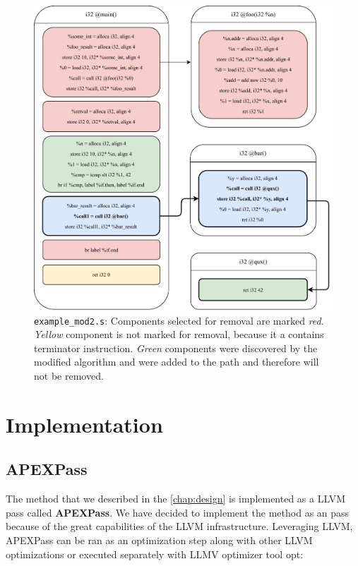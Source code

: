 \documentclass[12pt, twoside]{fithesis2}
\renewcommand{\_}{\leavevmode \kern0.07em\vbox{\hrule width0.4em}}
\begin{document}
\begin{figure}[ht]
    \centering
    \includegraphics[]{images/example_mod2/example_mod2_removing_prepare.pdf}
    \caption{
    \texttt{example_mod2.s}:
    Components selected for removal are marked \emph{red}.
    \emph{Yellow} component is not marked for removal, because it a contains
    terminator instruction.
    \emph{Green} components were discovered by the modified
    algorithm and were added to the path and therefore will not be removed.
    }
    \label{fig:mod2_prepare}
\end{figure}



\chapter{Implementation}
\label{chap:implementation}

\section{APEXPass}
\label{sec:impl_apexpass}

The method that we described in the \autoref{chap:design} is implemented as a
LLVM pass called \textbf{APEXPass}.
We have decided to implement the method as an pass because of the great
capabilities of the LLVM infrastructure. Leveraging LLVM, APEXPass can be ran
as an optimization step along with other LLVM optimizations or executed
separately with LLMV optimizer tool opt:
\end{document}
